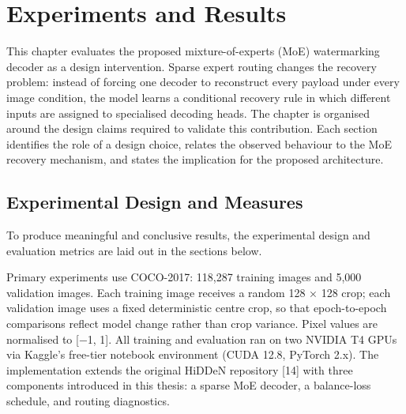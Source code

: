 ﻿\documentclass[12pt, a4paper, twoside]{report}
\numberwithin{equation}{chapter}
\begin{document}
\chapter{Experiments and Results}

This chapter evaluates the proposed mixture-of-experts (MoE) watermarking decoder as a design intervention. Sparse expert routing changes the recovery problem: instead of forcing one decoder to reconstruct every payload under every image condition, the model learns a conditional recovery rule in which different inputs are assigned to specialised decoding heads.
The chapter is organised around the design claims required to validate this contribution. Each section identifies the role of a design choice, relates the observed behaviour to the MoE recovery mechanism, and states the implication for the proposed architecture.


\section{Experimental Design and Measures}
\label{sec:setup}

To produce meaningful and conclusive results, the experimental design and evaluation metrics are laid out in the sections below. 

Primary experiments use COCO-2017: 118,287 training images and 5,000 validation images. Each training image receives a random 128 × 128 crop; each validation image uses a fixed deterministic centre crop, so that epoch-to-epoch comparisons reflect model change rather than crop variance. Pixel values are normalised to [−1, 1]. All training and evaluation ran on two NVIDIA T4 GPUs via Kaggle's free-tier notebook environment (CUDA 12.8, PyTorch 2.x). The implementation extends the original HiDDeN repository [14] with three components introduced in this thesis: a sparse MoE decoder, a balance-loss schedule, and routing diagnostics.
\end{document}
